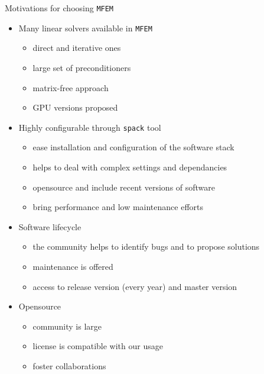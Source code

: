 \documentclass{beamer}
\begin{document}
\begin{frame}[fragile]{Motivations for choosing \texttt{MFEM} }
\begin{itemize}
\item Many linear solvers available in \texttt{MFEM}
  \begin{itemize} 
  \item direct and iterative ones
  \item large set of preconditioners
  \item matrix-free approach
  \item GPU versions proposed
  \end{itemize}
\vspace*{1mm}
\item Highly configurable through \texttt{spack} tool
 \begin{itemize}
  \item ease installation and configuration of the software stack
  \item helps to deal with complex settings and dependancies
  \item opensource and include recent versions of software
  \item bring performance and low maintenance efforts
  \end{itemize}
\vspace*{1mm}
\item Software lifecycle
  \begin{itemize}
  \item the community helps to identify bugs and to propose solutions
  \item maintenance is offered
  \item access to release version (every year) and master version
  \end{itemize}
\item Opensource
  \begin{itemize}
  \item community is large
  \item license is compatible with our usage
  \item foster collaborations
  \end{itemize}
\end{itemize}


\end{frame}
\end{document}
